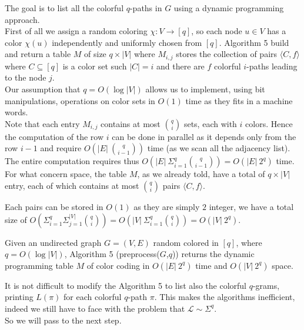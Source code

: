 The goal is to list all the colorful $q$-paths in $G$ using a dynamic programming approach.\\

First of all we assign a random coloring $\chi : V \rightarrow [q]$, so each node $u \in V$ has a color $\chi(u)$ independently and uniformly chosen from $[q]$.
Algorithm 5 build and return a table $M$ of size $q \times |V|$ 
where $M_{i,j}$ stores the collection of pairs $\langle C, f \rangle$ where  $C \subseteq [q]$ is a color set such $|C| = i$ and there are $f$ colorful $i$-paths leading to the node $j$.\\

Our assumption that $q = O(\log |V|)$ allows us to implement, using bit manipulations, operations on color sets in $O(1)$ time as they fits in a machine words.\\

Note that each entry $M_{i, j}$ contains at most $\binom{q}{i}$ sets, each with $i$ colors.
Hence the computation of the row $i$ can be done in parallel as it depends only from the row $i-1$ and require $O(|E|\ \binom{q}{i-1})$ time (as we scan all the adjacency list).
The entire computation requires thus $O(|E|\ \Sigma_{i=1}^{q}{\binom{q}{i-1}}) = O(|E|\ 2^{q})$ time.\\

For what concern space, the table $M$, as we already told, have a total of $q \times |V|$ entry, each of which contains at most $\binom{q}{i}$ pairs $\langle C, f \rangle$.

Each pairs can be stored in $O(1)$ as they are simply $2$ integer, we have a total size of $O(\Sigma_{i=1}^{q}{\Sigma_{j=1}^{|V|}{ \binom{q}{i}}}) = O(|V|\ \Sigma_{i=1}^{q}{\binom{q}{i}}) = O(|V|\ 2^{q})$.

\begin{lemma}
	Given an undirected graph $G=(V, E)$ random colored in $[q]$, where $q = O(\log |V|)$, Algorithm 5 (preprocess($G$,$q$))
	returns the dynamic programming table $M$ of color coding in $O(|E|\ 2^{q})$ time and $O(|V|\ 2^{q})$ space. 
\end{lemma}

It is not difficult to modify the Algorithm 5 to list also the colorful $q$-grams, printing $L(\pi)$ for each colorful $q$-path $\pi$.
This makes the algorithms inefficient, indeed we still have to face with the problem that $\mathcal{L} \sim \Sigma^{q}$. \\

So we will pass to the next step.

